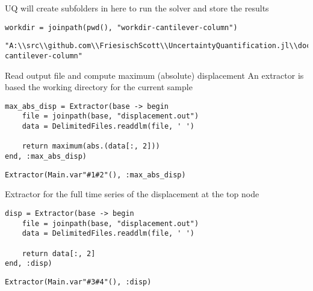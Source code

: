 UQ will create subfolders in here to run the solver and store the results




\begin{verbatim}
workdir = joinpath(pwd(), "workdir-cantilever-column")
\end{verbatim}


\begin{verbatim}
"A:\\src\\github.com\\FriesischScott\\UncertaintyQuantification.jl\\docs\\build\\examples\\workdir-cantilever-column"
\end{verbatim}



Read output file and compute maximum (absolute) displacement An extractor is based the working directory for the current sample




\begin{verbatim}
max_abs_disp = Extractor(base -> begin
    file = joinpath(base, "displacement.out")
    data = DelimitedFiles.readdlm(file, ' ')

    return maximum(abs.(data[:, 2]))
end, :max_abs_disp)
\end{verbatim}


\begin{verbatim}
Extractor(Main.var"#1#2"(), :max_abs_disp)
\end{verbatim}



Extractor for the full time series of the displacement at the top node




\begin{verbatim}
disp = Extractor(base -> begin
    file = joinpath(base, "displacement.out")
    data = DelimitedFiles.readdlm(file, ' ')

    return data[:, 2]
end, :disp)
\end{verbatim}


\begin{verbatim}
Extractor(Main.var"#3#4"(), :disp)
\end{verbatim}



